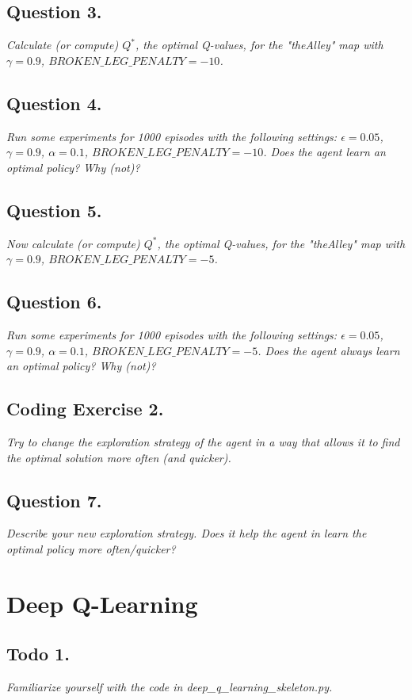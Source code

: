 \documentclass{report}
\newcommand{\q}[1]{\color{gray}\textit{#1}\color{black}}
\begin{document}
		\subsection*{Question 3.}
		\q{Calculate (or compute) $Q^*$, the optimal Q-values, for the "theAlley" map with $\gamma = 0.9$, $BROKEN\_LEG\_PENALTY = -10$.}
		
		\subsection*{Question 4.}
		\q{Run some experiments for 1000 episodes with the following settings: $\epsilon = 0.05$, $\gamma = 0.9$, $\alpha = 0.1$, $BROKEN\_LEG\_PENALTY = -10$. Does the agent learn an optimal policy? Why (not)?}
		
		\subsection*{Question 5.}
		\q{Now calculate (or compute) $Q^*$, the optimal Q-values, for the "theAlley" map with $\gamma = 0.9$, $BROKEN\_LEG\_PENALTY = -5$.}
		
		\subsection*{Question 6.}
		\q{Run some experiments for 1000 episodes with the following settings: $\epsilon = 0.05$, $\gamma = 0.9$, $\alpha = 0.1$, $BROKEN\_LEG\_PENALTY = -5$. Does the agent always learn an optimal policy? Why (not)?}
		
		\subsection*{Coding Exercise 2.}
		\q{Try to change the exploration strategy of the agent in a way that allows it to find the optimal solution more often (and quicker).}
		
		\subsection*{Question 7.}
		\q{Describe your new exploration strategy.  Does it help the agent in learn the optimal policy more often/quicker?}
		
	\section*{Deep Q-Learning}
	
		\subsection*{Todo 1.}
		\q{Familiarize yourself with the code in deep\_q\_learning\_skeleton.py.}
		
\end{document}
